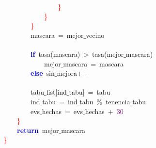 \mbox{}\ \ \ \ \ \ \ \ \ \ \ \ \ \ \ \ \textcolor{Red}{\}} \\
\mbox{}\ \ \ \ \ \ \ \ \ \ \ \ \textcolor{Red}{\}} \\
\mbox{}\ \ \ \ \ \ \ \ \textcolor{Red}{\}} \\
\mbox{}\ \ \ \ \ \ \ \ mascara\ \textcolor{BrickRed}{=}\ mejor$\_$vecino \\
\mbox{} \\
\mbox{}\ \ \ \ \ \ \ \ \textbf{\textcolor{Blue}{if}}\ tasa\textcolor{BrickRed}{(}mascara\textcolor{BrickRed}{)}\ \textcolor{BrickRed}{\textgreater{}}\ tasa\textcolor{BrickRed}{(}mejor$\_$mascara\textcolor{BrickRed}{)} \\
\mbox{}\ \ \ \ \ \ \ \ \ \ \ \ mejor$\_$mascara\ \textcolor{BrickRed}{=}\ mascara \\
\mbox{}\ \ \ \ \ \ \ \ \textbf{\textcolor{Blue}{else}}\ sin$\_$mejora\textcolor{BrickRed}{++} \\
\mbox{} \\
\mbox{}\ \ \ \ \ \ \ \ tabu$\_$list\textcolor{BrickRed}{[}ind$\_$tabu\textcolor{BrickRed}{]}\ \textcolor{BrickRed}{=}\ tabu \\
\mbox{}\ \ \ \ \ \ \ \ ind$\_$tabu\ \textcolor{BrickRed}{=}\ ind$\_$tabu\ \textcolor{BrickRed}{\%}\ tenencia$\_$tabu \\
\mbox{}\ \ \ \ \ \ \ \ evs$\_$hechas\ \textcolor{BrickRed}{=}\ evs$\_$hechas\ \textcolor{BrickRed}{+}\ \textcolor{Purple}{30} \\
\mbox{}\ \ \ \ \textcolor{Red}{\}} \\
\mbox{}\ \ \ \ \textbf{\textcolor{Blue}{return}}\ mejor$\_$mascara \\
\mbox{}\textcolor{Red}{\}} \\
\mbox{}
